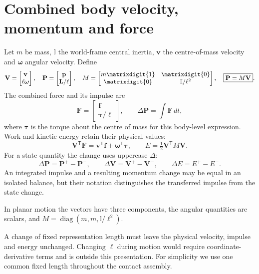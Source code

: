 \documentclass[11pt,a4paper]{article}
\newcommand{\id}{\matrixdigit{1}}
\newcommand{\zmat}{\matrixdigit{0}}
\newcommand{\inertia}{\mathbb I}
\begin{document}
\section{Combined body velocity, momentum and force}
Let $m$ be mass, $\inertia$ the world-frame central inertia, $\mathbf{v}$ the centre-of-mass velocity and $\boldsymbol{\omega}$ angular velocity. Define
\begin{equation}
\mathbf{V}=\begin{bmatrix}\mathbf{v}\\\ell\boldsymbol{\omega}\end{bmatrix},\quad
\mathbf{P}=\begin{bmatrix}\mathbf{p}\\\mathbf{L}/\ell\end{bmatrix},\quad
M=\begin{bmatrix}m\id&\zmat\\\zmat&\inertia/\ell^2\end{bmatrix},\quad
\boxed{\mathbf{P}=M\mathbf{V}}.
\end{equation}
The combined force and its impulse are
\begin{equation}
\mathbf{F}=\begin{bmatrix}\mathbf{f}\\\boldsymbol{\tau}/\ell\end{bmatrix},\qquad
\Delta\mathbf{P}=\int \mathbf{F}\,dt,
\end{equation}
where $\boldsymbol{\tau}$ is the torque about the centre of mass for this body-level expression. Work and kinetic energy retain their physical values:
\begin{equation}
\mathbf{V}^{\mathsf T}\mathbf{F}
=\mathbf{v}^{\mathsf T}\mathbf{f}+\boldsymbol{\omega}^{\mathsf T}\boldsymbol{\tau},\qquad
E=\tfrac12\mathbf{V}^{\mathsf T}M\mathbf{V}.
\end{equation}
For a state quantity the change uses uppercase $\Delta$:
\begin{equation}
\Delta\mathbf{P}=\mathbf{P}^+-\mathbf{P}^-,\qquad
\Delta\mathbf{V}=\mathbf{V}^+-\mathbf{V}^-,\qquad
\Delta E=E^+-E^-.
\end{equation}
An integrated impulse and a resulting momentum change may be equal in an isolated balance, but their notation distinguishes the transferred impulse from the state change.

In planar motion the vectors have three components, the angular quantities are scalars, and $M=\operatorname{diag}(m,m,\inertia/\ell^2)$.

A change of fixed representation length must leave the physical velocity, impulse and energy unchanged. Changing $\ell$ during motion would require coordinate-derivative terms and is outside this presentation. For simplicity we use one common fixed length throughout the contact assembly.
\end{document}
